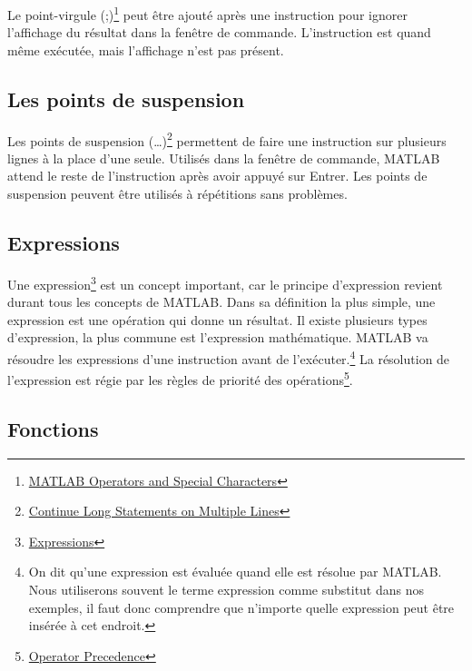 \documentclass[]{tufte-handout}
\begin{document}
Le point-virgule (;)\footnote{\href{https://www.mathworks.com/help/matlab/matlab_prog/matlab-operators-and-special-characters.html}{MATLAB
  Operators and Special Characters}} peut être ajouté après une
instruction pour ignorer l'affichage du résultat dans la fenêtre de
commande. L'instruction est quand même exécutée, mais l'affichage n'est
pas présent.

\hypertarget{les-points-de-suspension}{%
\subsection{Les points de suspension}\label{les-points-de-suspension}}

Les points de suspension (\ldots{})\footnote{\href{https://www.mathworks.com/help/matlab/matlab_prog/continue-long-statements-on-multiple-lines.html}{Continue
  Long Statements on Multiple Lines}} permettent de faire une
instruction sur plusieurs lignes à la place d'une seule. Utilisés dans
la fenêtre de commande, MATLAB attend le reste de l'instruction après
avoir appuyé sur Entrer. Les points de suspension peuvent être utilisés
à répétitions sans problèmes.

\hypertarget{expressions}{%
\subsection{Expressions}\label{expressions}}

Une expression\footnote{\href{https://www.mathworks.com/help/matlab/learn_matlab/expressions.html}{Expressions}}
est un concept important, car le principe d'expression revient durant
tous les concepts de MATLAB. Dans sa définition la plus simple, une
expression est une opération qui donne un résultat. Il existe plusieurs
types d'expression, la plus commune est l'expression mathématique.
MATLAB va résoudre les expressions d'une instruction avant de
l'exécuter.\footnote{On dit qu'une expression est évaluée quand elle est
  résolue par MATLAB. Nous utiliserons souvent le terme expression comme
  substitut dans nos exemples, il faut donc comprendre que n'importe
  quelle expression peut être insérée à cet endroit.} La résolution de
l'expression est régie par les règles de priorité des
opérations\footnote{\href{https://www.mathworks.com/help/matlab/matlab_prog/operator-precedence.html}{Operator
  Precedence}}.

\hypertarget{fonctions}{%
\subsection{Fonctions}\label{fonctions}}
\end{document}
